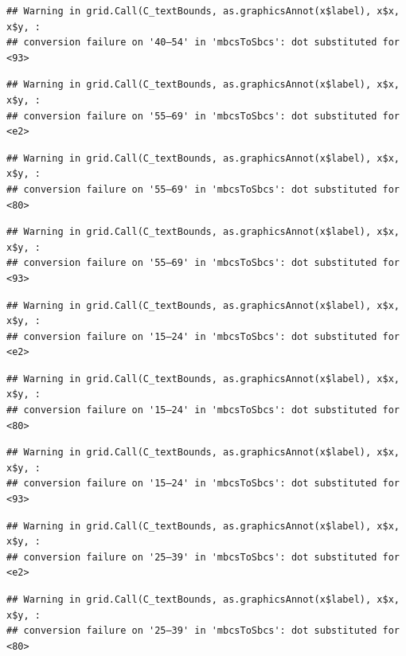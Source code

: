\documentclass[
]{article}
\begin{document}
\begin{verbatim}
## Warning in grid.Call(C_textBounds, as.graphicsAnnot(x$label), x$x, x$y, :
## conversion failure on '40–54' in 'mbcsToSbcs': dot substituted for <93>
\end{verbatim}

\begin{verbatim}
## Warning in grid.Call(C_textBounds, as.graphicsAnnot(x$label), x$x, x$y, :
## conversion failure on '55–69' in 'mbcsToSbcs': dot substituted for <e2>
\end{verbatim}

\begin{verbatim}
## Warning in grid.Call(C_textBounds, as.graphicsAnnot(x$label), x$x, x$y, :
## conversion failure on '55–69' in 'mbcsToSbcs': dot substituted for <80>
\end{verbatim}

\begin{verbatim}
## Warning in grid.Call(C_textBounds, as.graphicsAnnot(x$label), x$x, x$y, :
## conversion failure on '55–69' in 'mbcsToSbcs': dot substituted for <93>
\end{verbatim}

\begin{verbatim}
## Warning in grid.Call(C_textBounds, as.graphicsAnnot(x$label), x$x, x$y, :
## conversion failure on '15–24' in 'mbcsToSbcs': dot substituted for <e2>
\end{verbatim}

\begin{verbatim}
## Warning in grid.Call(C_textBounds, as.graphicsAnnot(x$label), x$x, x$y, :
## conversion failure on '15–24' in 'mbcsToSbcs': dot substituted for <80>
\end{verbatim}

\begin{verbatim}
## Warning in grid.Call(C_textBounds, as.graphicsAnnot(x$label), x$x, x$y, :
## conversion failure on '15–24' in 'mbcsToSbcs': dot substituted for <93>
\end{verbatim}

\begin{verbatim}
## Warning in grid.Call(C_textBounds, as.graphicsAnnot(x$label), x$x, x$y, :
## conversion failure on '25–39' in 'mbcsToSbcs': dot substituted for <e2>
\end{verbatim}

\begin{verbatim}
## Warning in grid.Call(C_textBounds, as.graphicsAnnot(x$label), x$x, x$y, :
## conversion failure on '25–39' in 'mbcsToSbcs': dot substituted for <80>
\end{verbatim}
\end{document}
